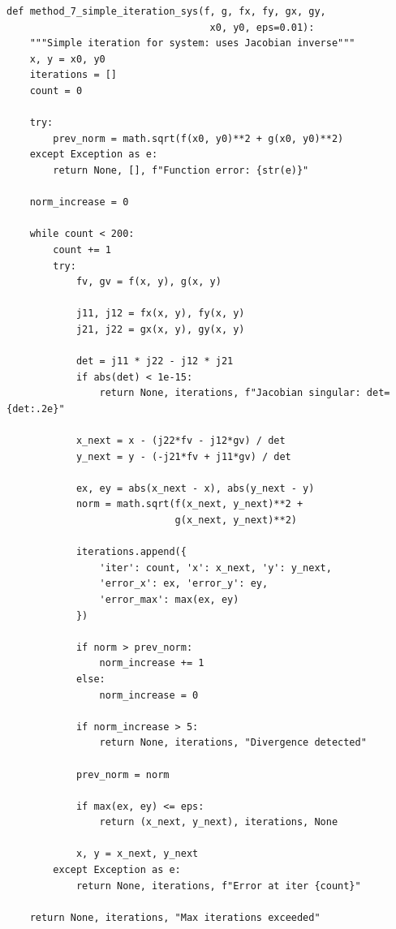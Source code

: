 \documentclass[a4paper,12pt]{article}
\begin{document}
\begin{lstlisting}[style=intellij,caption={method\_7\_simple\_iteration\_sys()},basicstyle=\ttfamily\small\color{intj-id}]
def method_7_simple_iteration_sys(f, g, fx, fy, gx, gy,
                                   x0, y0, eps=0.01):
    """Simple iteration for system: uses Jacobian inverse"""
    x, y = x0, y0
    iterations = []
    count = 0
    
    try:
        prev_norm = math.sqrt(f(x0, y0)**2 + g(x0, y0)**2)
    except Exception as e:
        return None, [], f"Function error: {str(e)}"
    
    norm_increase = 0
    
    while count < 200:
        count += 1
        try:
            fv, gv = f(x, y), g(x, y)
            
            j11, j12 = fx(x, y), fy(x, y)
            j21, j22 = gx(x, y), gy(x, y)
            
            det = j11 * j22 - j12 * j21
            if abs(det) < 1e-15:
                return None, iterations, f"Jacobian singular: det={det:.2e}"
            
            x_next = x - (j22*fv - j12*gv) / det
            y_next = y - (-j21*fv + j11*gv) / det
            
            ex, ey = abs(x_next - x), abs(y_next - y)
            norm = math.sqrt(f(x_next, y_next)**2 +
                             g(x_next, y_next)**2)
            
            iterations.append({
                'iter': count, 'x': x_next, 'y': y_next,
                'error_x': ex, 'error_y': ey,
                'error_max': max(ex, ey)
            })
            
            if norm > prev_norm:
                norm_increase += 1
            else:
                norm_increase = 0
            
            if norm_increase > 5:
                return None, iterations, "Divergence detected"
            
            prev_norm = norm
            
            if max(ex, ey) <= eps:
                return (x_next, y_next), iterations, None
            
            x, y = x_next, y_next
        except Exception as e:
            return None, iterations, f"Error at iter {count}"
    
    return None, iterations, "Max iterations exceeded"
\end{lstlisting}
\end{document}

